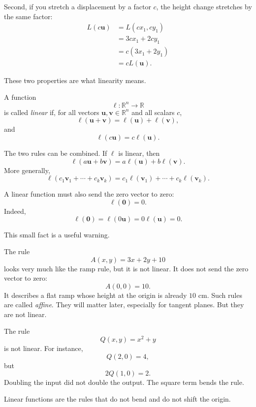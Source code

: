 Second, if you stretch a displacement by a factor \(c\), the height change stretches by
the same factor:
\[
\begin{aligned}
L(c\mathbf u)
&=
L(cx_1,cy_1)\\
&=
3cx_1+2cy_1\\
&=
c(3x_1+2y_1)\\
&=
cL(\mathbf u).
\end{aligned}
\]

These two properties are what linearity means.

\begin{definition}
A function
\[
    \ell:\mathbb R^n\to\mathbb R
\]
is called \emph{linear} if, for all vectors \(\mathbf u,\mathbf v\in\mathbb R^n\)
and all scalars \(c\),
\[
    \ell(\mathbf u+\mathbf v)=\ell(\mathbf u)+\ell(\mathbf v),
\]
and
\[
    \ell(c\mathbf u)=c\ell(\mathbf u).
\]
\end{definition}

The two rules can be combined.  If \(\ell\) is linear, then
\[
    \ell(a\mathbf u+b\mathbf v)
    =
    a\ell(\mathbf u)+b\ell(\mathbf v).
\]
More generally,
\[
    \ell(c_1\mathbf v_1+\cdots+c_k\mathbf v_k)
    =
    c_1\ell(\mathbf v_1)+\cdots+c_k\ell(\mathbf v_k).
\]

A linear function must also send the zero vector to zero:
\[
    \ell(\mathbf 0)=0.
\]
Indeed,
\[
    \ell(\mathbf 0)=\ell(0\mathbf u)=0\ell(\mathbf u)=0.
\]

This small fact is a useful warning.

\begin{example}
The rule
\[
    A(x,y)=3x+2y+10
\]
looks very much like the ramp rule, but it is not linear.  It does not send the zero
vector to zero:
\[
    A(0,0)=10.
\]
It describes a flat ramp whose height at the origin is already \(10\) cm.  Such rules are
called \emph{affine}.  They will matter later, especially for tangent planes.  But they
are not linear.
\end{example}

\begin{example}
The rule
\[
    Q(x,y)=x^2+y
\]
is not linear.  For instance,
\[
    Q(2,0)=4,
\]
but
\[
    2Q(1,0)=2.
\]
Doubling the input did not double the output.  The square term bends the rule.
\end{example}

Linear functions are the rules that do not bend and do not shift the origin.

